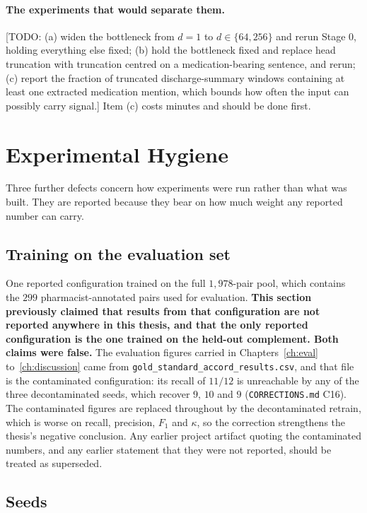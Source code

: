 \paragraph{The experiments that would separate them.} [TODO: (a) widen the
bottleneck from $d = 1$ to $d \in \{64, 256\}$ and rerun Stage 0, holding
everything else fixed; (b) hold the bottleneck fixed and replace head truncation
with truncation centred on a medication-bearing sentence, and rerun; (c) report
the fraction of truncated discharge-summary windows containing at least one
extracted medication mention, which bounds how often the input can possibly
carry signal.] Item (c) costs minutes and should be done first.

\section{Experimental Hygiene}
\label{sec:hygiene}

Three further defects concern how experiments were run rather than what was
built. They are reported because they bear on how much weight any reported
number can carry.

\subsection{Training on the evaluation set}

One reported configuration trained on the full $1{,}978$-pair pool, which
contains the $299$ pharmacist-annotated pairs used for evaluation. \textbf{This
section previously claimed that results from that configuration are not reported
anywhere in this thesis, and that the only reported configuration is the one
trained on the held-out complement. Both claims were false.} The evaluation
figures carried in Chapters~\ref{ch:eval} to~\ref{ch:discussion} came from
\texttt{gold\_standard\_accord\_results.csv}, and that file is the contaminated
configuration: its recall of $11/12$ is unreachable by any of the three
decontaminated seeds, which recover $9$, $10$ and $9$
(\texttt{CORRECTIONS.md} C16). The contaminated figures are replaced throughout
by the decontaminated retrain, which is worse on recall, precision, $F_1$ and
$\kappa$, so the correction strengthens the thesis's negative conclusion. Any
earlier project artifact quoting the contaminated numbers, and any earlier
statement that they were not reported, should be treated as superseded.

\subsection{Seeds}

